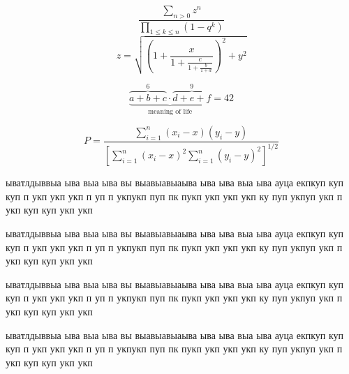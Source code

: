 \documentclass{khaireport}
\begin{document}
\begin{equation}
\frac{{\displaystyle\sum\nolimits_{n> 0} z^n}}
{{\displaystyle\prod\nolimits_{1\leq k\leq n} (1-q^k)}}
\end{equation}
\begin{equation}
z = \sqrt{(1 + \frac{x}{1 + \frac{c}{1 + \frac{b}{1+d}}})^2+y^2}
\end{equation}

\begin{equation}
\underbrace{\overbrace{a+b+c}^6
\cdot \overbrace{d+e+f}^9}
_\text{meaning of life} = 42
\end{equation}

\begin{equation}
P = \frac{\displaystyle{
\sum_{i=1}^n (x_i- x)
(y_i- y)}}
{\displaystyle{\left[
\sum_{i=1}^n(x_i-x)^2
\sum_{i=1}^n(y_i- y)^2
\right]^{1/2}}}
\end{equation}

ыватлдыввыа ыва выа ыва вы
выавыавыаыва ыва ыва выа ыва ауца екпкуп
куп куп п укп укп укп п уп п укпукп
пуп  пк пукп укп укп укп ку пуп укпуп укп
п укп куп куп укп укп

ыватлдыввыа ыва выа ыва вы
выавыавыаыва ыва ыва выа ыва ауца екпкуп
куп куп п укп укп укп п уп п укпукп
пуп  пк пукп укп укп укп ку пуп укпуп укп
п укп куп куп укп укп


ыватлдыввыа ыва выа ыва вы
выавыавыаыва ыва ыва выа ыва ауца екпкуп
куп куп п укп укп укп п уп п укпукп
пуп  пк пукп укп укп укп ку пуп укпуп укп
п укп куп куп укп укп

ыватлдыввыа ыва выа ыва вы
выавыавыаыва ыва ыва выа ыва ауца екпкуп
куп куп п укп укп укп п уп п укпукп
пуп  пк пукп укп укп укп ку пуп укпуп укп
п укп куп куп укп укп
\end{document}
